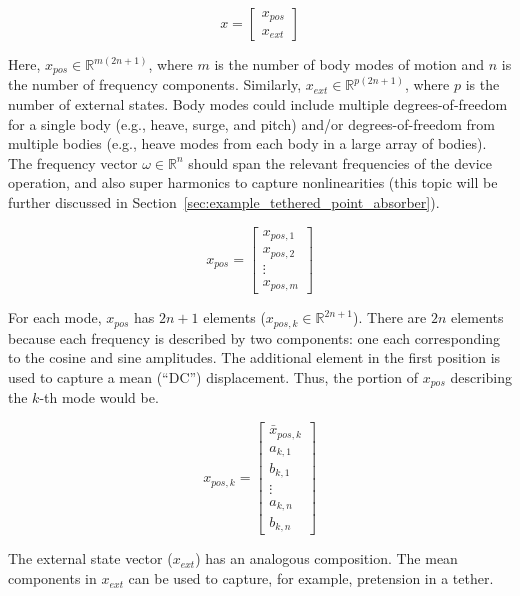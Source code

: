 \documentclass[]{article}
\begin{document}
\begin{equation}\label{eq:decision_variable}
	x =
	\begin{bmatrix}
		x_{pos}\\
		x_{ext}
	\end{bmatrix}
\end{equation}

\noindent{}Here, $x_{pos} \in \mathbb{R}^{m(2n + 1)}$, where $m$ is the number of body modes of motion and $n$ is the number of frequency components.
Similarly, $x_{ext} \in \mathbb{R}^{p(2n+1)}$, where $p$ is the number of external states.
Body modes could include multiple degrees-of-freedom for a single body (e.g., heave, surge, and pitch) and/or degrees-of-freedom from multiple bodies (e.g., heave modes from each body in a large array of bodies).
The frequency vector $\omega \in \mathbb{R}^n$ should span the relevant frequencies of the device operation, and also super harmonics to capture nonlinearities (this topic will be further discussed in Section~\ref{sec:example_tethered_point_absorber}).

\begin{equation}
	x_{pos} =
	\begin{bmatrix}
		x_{pos,1} \\
		x_{pos,2} \\
		\vdots \\
		x_{pos,m}
	\end{bmatrix}
\end{equation}

For each mode, $x_{pos}$ has $2n + 1$ elements ($x_{pos,k} \in \mathbb{R}^{2n + 1}$).
There are $2n$ elements because each frequency is described by two components: one each corresponding to the cosine and sine amplitudes.
The additional element in the first position is used to capture a mean (``DC'') displacement.
Thus, the portion of $x_{pos}$ describing the $k$-th mode would be.

\begin{equation}
	x_{pos,k} =
	\begin{bmatrix}
		\bar{x}_{pos,k} \\
		a_{k,1} \\
		b_{k,1} \\
		\vdots \\
		a_{k,n} \\
		b_{k,n}
	\end{bmatrix}
\end{equation}

\noindent{}The external state vector ($x_{ext}$) has an analogous composition.
The mean components in $x_{ext}$ can be used to capture, for example, pretension in a tether.
\end{document}
